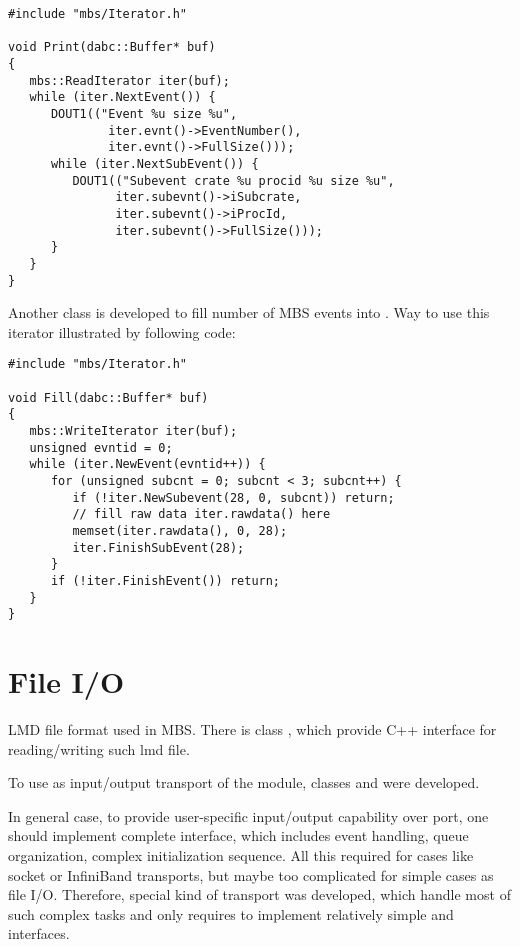 \begin{verbatim}
#include "mbs/Iterator.h"

void Print(dabc::Buffer* buf)
{
   mbs::ReadIterator iter(buf);
   while (iter.NextEvent()) {
      DOUT1(("Event %u size %u", 
              iter.evnt()->EventNumber(), 
              iter.evnt()->FullSize()));
      while (iter.NextSubEvent()) {
         DOUT1(("Subevent crate %u procid %u size %u",
               iter.subevnt()->iSubcrate, 
               iter.subevnt()->iProcId, 
               iter.subevnt()->FullSize()));
      }
   }
}
\end{verbatim}

Another class  is developed to fill number  
of MBS events into . Way to use this iterator 
illustrated by following code:

\begin{verbatim}
#include "mbs/Iterator.h"

void Fill(dabc::Buffer* buf)
{
   mbs::WriteIterator iter(buf);
   unsigned evntid = 0;
   while (iter.NewEvent(evntid++)) {
      for (unsigned subcnt = 0; subcnt < 3; subcnt++) {
         if (!iter.NewSubevent(28, 0, subcnt)) return;
         // fill raw data iter.rawdata() here
         memset(iter.rawdata(), 0, 28);
         iter.FinishSubEvent(28);
      } 
      if (!iter.FinishEvent()) return;
   }
}
\end{verbatim}


\section{File I/O}

LMD file format used in MBS. There is class , which provide
C++ interface for reading/writing such lmd file.

To use  as input/output transport of the module, classes  
and  were developed. 

In general case, to provide user-specific input/output capability over port, 
one should implement complete  interface, which includes 
event handling, queue organization, complex initialization sequence. 
All this required for cases like socket or InfiniBand transports, 
but maybe too complicated for simple cases as file I/O. Therefore, special kind of
transport  was developed, which handle most of such complex tasks
and only requires to implement relatively simple  and
 interfaces.


